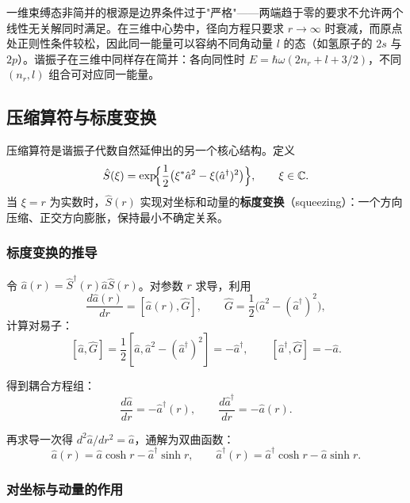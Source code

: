 \begin{insightbox}[一维 vs 高维]
一维束缚态非简并的根源是边界条件过于"严格"——两端趋于零的要求不允许两个线性无关解同时满足。在三维中心势中，径向方程只要求 $r\to\infty$ 时衰减，而原点处正则性条件较松，因此同一能量可以容纳不同角动量 $l$ 的态（如氢原子的 $2s$ 与 $2p$）。谐振子在三维中同样存在简并：各向同性时 $E = \hbar\omega(2n_r+l+3/2)$，不同 $(n_r,l)$ 组合可对应同一能量。
\end{insightbox}

\subsection{压缩算符与标度变换}

压缩算符是谐振子代数自然延伸出的另一个核心结构。定义
\begin{equation}
\hat{S}(\xi) = \exp\!\Bigl\{\frac12\bigl(\xi^*\hat{a}^2 - \xi(\hat{a}^\dagger)^2\bigr)\Bigr\},
\qquad \xi\in\mathbb{C}.
\end{equation}
当 $\xi=r$ 为实数时，$\hat{S}(r)$ 实现对坐标和动量的\textbf{标度变换}（squeezing）：一个方向压缩、正交方向膨胀，保持最小不确定关系。

\subsubsection{标度变换的推导}

令 $\hat{a}(r) = \hat{S}^\dagger(r)\hat{a}\hat{S}(r)$。对参数 $r$ 求导，利用
\[
\frac{d\hat{a}(r)}{dr} = [\hat{a}(r), \hat{G}],
\qquad \hat{G} = \frac12\bigl(\hat{a}^2 - (\hat{a}^\dagger)^2\bigr),
\]
计算对易子：
\[
[\hat{a}, \hat{G}] = \frac12[\hat{a}, \hat{a}^2 - (\hat{a}^\dagger)^2] = -\hat{a}^\dagger,
\qquad
[\hat{a}^\dagger, \hat{G}] = -\hat{a}.
\]

得到耦合方程组：
\[
\frac{d\hat{a}}{dr} = -\hat{a}^\dagger(r),
\qquad
\frac{d\hat{a}^\dagger}{dr} = -\hat{a}(r).
\]

再求导一次得 $d^2\hat{a}/dr^2 = \hat{a}$，通解为双曲函数：
\begin{equation}
\boxed{\hat{a}(r) = \hat{a}\cosh r - \hat{a}^\dagger\sinh r,
\qquad
\hat{a}^\dagger(r) = \hat{a}^\dagger\cosh r - \hat{a}\sinh r.}
\end{equation}

\subsubsection{对坐标与动量的作用}

